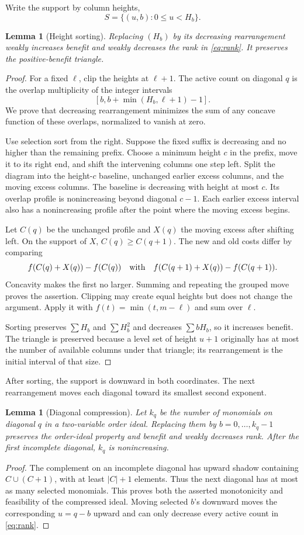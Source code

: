 \documentclass[11pt]{article}
\newtheorem{lemma}[theorem]{Lemma}
\theoremstyle{remark}\newtheorem{remark}[theorem]{Remark}
\begin{document}
Write the support by column heights,
\[
 S=\{(u,b):0\le u<H_b\}.
\]
\begin{lemma}[Height sorting]\label{lem:sorting}
Replacing $(H_b)$ by its decreasing rearrangement weakly increases benefit and weakly decreases the rank in \eqref{eq:rank}. It preserves the positive-benefit triangle.
\end{lemma}
\begin{proof}
For a fixed $\ell$, clip the heights at $\ell+1$. The active count on diagonal $q$ is the overlap multiplicity of the integer intervals
\[
 [b,b+\min(H_b,\ell+1)-1].
\]
We prove that decreasing rearrangement minimizes the sum of any concave function of these overlaps, normalized to vanish at zero.

Use selection sort from the right. Suppose the fixed suffix is decreasing and no higher than the remaining prefix. Choose a minimum height $c$ in the prefix, move it to its right end, and shift the intervening columns one step left. Split the diagram into the height-$c$ baseline, unchanged earlier excess columns, and the moving excess columns. The baseline is decreasing with height at most $c$. Its overlap profile is nonincreasing beyond diagonal $c-1$. Each earlier excess interval also has a nonincreasing profile after the point where the moving excess begins.

Let $C(q)$ be the unchanged profile and $X(q)$ the moving excess after shifting left. On the support of $X$, $C(q)\ge C(q+1)$. The new and old costs differ by comparing
\[
 f(C(q)+X(q))-f(C(q))
 \quad\hbox{with}\quad
 f(C(q+1)+X(q))-f(C(q+1)).
\]
Concavity makes the first no larger. Summing and repeating the grouped move proves the assertion. Clipping may create equal heights but does not change the argument. Apply it with $f(t)=\min(t,m-\ell)$ and sum over $\ell$.

Sorting preserves $\sum H_b$ and $\sum H_b^2$ and decreases $\sum bH_b$, so it increases benefit. The triangle is preserved because a level set of height $u+1$ originally has at most the number of available columns under that triangle; its rearrangement is the initial interval of that size.
\end{proof}

After sorting, the support is downward in both coordinates. The next rearrangement moves each diagonal toward its smallest second exponent.
\begin{lemma}[Diagonal compression]\label{lem:lex}
Let $k_q$ be the number of monomials on diagonal $q$ in a two-variable order ideal. Replacing them by $b=0,\ldots,k_q-1$ preserves the order-ideal property and benefit and weakly decreases rank. After the first incomplete diagonal, $k_q$ is nonincreasing.
\end{lemma}
\begin{proof}
The complement on an incomplete diagonal has upward shadow containing $C\cup(C+1)$, with at least $|C|+1$ elements. Thus the next diagonal has at most as many selected monomials. This proves both the asserted monotonicity and feasibility of the compressed ideal. Moving selected $b$'s downward moves the corresponding $u=q-b$ upward and can only decrease every active count in \eqref{eq:rank}.
\end{proof}
\end{document}
